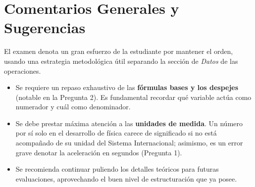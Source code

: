 \documentclass[12pt,letterpaper]{article}
\begin{document}
\section*{Comentarios Generales y Sugerencias}
El examen denota un gran esfuerzo de la estudiante por mantener el orden, usando una estrategia metodológica útil separando la sección de \textit{Datos} de las operaciones.
\begin{itemize}
    \item Se requiere un repaso exhaustivo de las \textbf{fórmulas bases y los despejes} (notable en la Pregunta 2). Es fundamental recordar qué variable actúa como numerador y cuál como denominador.
    \item Se debe prestar máxima atención a las \textbf{unidades de medida}. Un número por sí solo en el desarrollo de física carece de significado si no está acompañado de su unidad del Sistema Internacional; asimismo, es un error grave denotar la aceleración en segundos (Pregunta 1).
    \item Se recomienda continuar puliendo los detalles teóricos para futuras evaluaciones, aprovechando el buen nivel de estructuración que ya posee.
\end{itemize}
\end{document}
